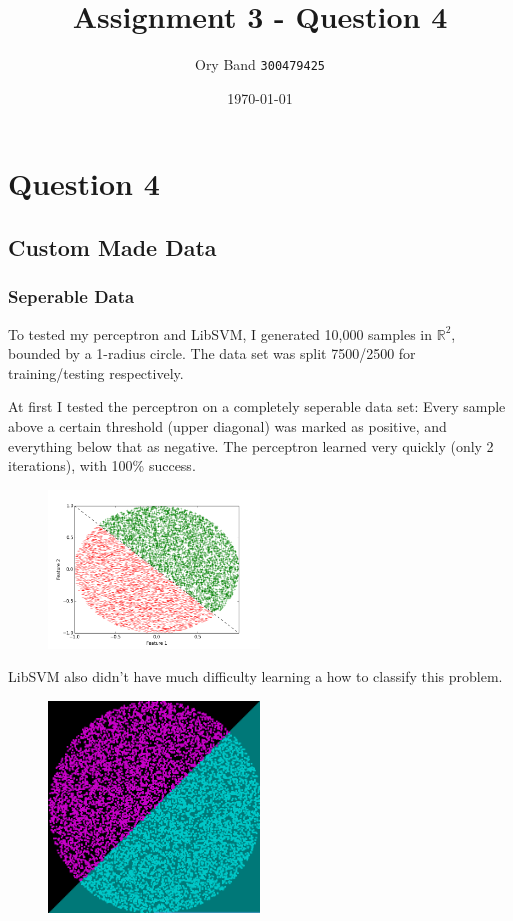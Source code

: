 \documentclass[a4paper]{article}
\title{Assignment 3 - Question 4}
\author{Ory Band \texttt{300479425}}
\date{\today}
\begin{document}
\maketitle
\newpage

\section {Question 4}

\subsection {Custom Made Data}

\subsubsection {Seperable Data}

To tested my perceptron and LibSVM,
I generated 10,000 samples in $\mathbb{R}^2$, bounded by a 1-radius circle.
The data set was split 7500/2500 for training/testing respectively.

At first I tested the perceptron on a completely seperable data set:
Every sample above a certain threshold (upper diagonal) was marked as positive,
and everything below that as negative.
The perceptron learned very quickly (only 2 iterations), with 100\% success.

\begin{figure}[h!]
    \includegraphics[width=0.5\textwidth]{images/seperable.png}
\end{figure}

LibSVM also didn't have much difficulty learning a how to classify this problem.

\begin{figure}[h!]
    \includegraphics[width=0.5\textwidth]{images/svm_seperable.png}
\end{figure}
\end{document}
